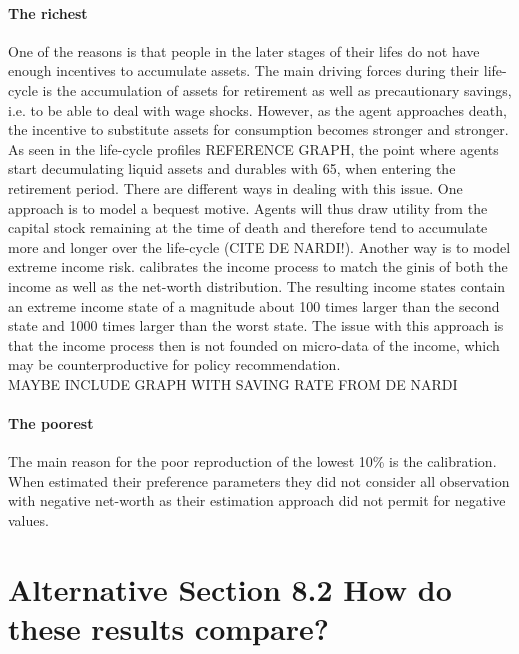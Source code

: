 \documentclass[12pt,a4paper,leqno]{article}
\theoremstyle{definition}
\begin{document}
\paragraph{The richest}
One of the reasons is that people in the later stages of their lifes do not have enough incentives to accumulate assets. The main driving forces during their life-cycle is the accumulation of assets for retirement as well as precautionary savings, i.e. to be able to deal with wage shocks. However, as the agent approaches death, the incentive to substitute assets for consumption becomes stronger and stronger. As seen in the life-cycle profiles REFERENCE GRAPH, the point where agents start decumulating liquid assets and durables with 65, when entering the retirement period. There are different ways in dealing with this issue. One approach is to model a bequest motive. Agents will thus draw utility from the capital stock remaining at the time of death and therefore tend to accumulate more and longer over the life-cycle (CITE DE NARDI!). Another way is to model extreme income risk. \citep{castaneda2003} calibrates the income process to match the ginis of both the income as well as the net-worth distribution. The resulting income states contain an extreme income state of a magnitude about 100 times larger than the second state and 1000 times larger than the worst state. The issue with this approach is that the income process then is not founded on micro-data of the income, which may be counterproductive for policy recommendation. 
\\
MAYBE INCLUDE GRAPH WITH SAVING RATE FROM DE NARDI
\\
\paragraph{The poorest}
The main reason for the poor reproduction of the lowest 10\% is the calibration. When \cite{hintermaier2011} estimated their preference parameters they did not consider all observation with negative net-worth as their estimation approach did not permit for negative values.

\section{Alternative Section 8.2 How do these results compare?}
\end{document}
